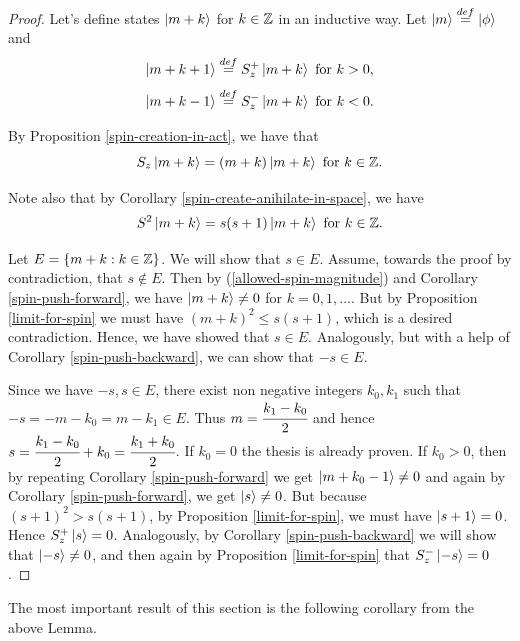 \documentclass[main.tex]{subfiles}
\begin{document}
\begin{proof}
Let's define states $\ket{m + k}$ for $k\in \mathbb{Z}$ in an inductive way. Let $\ket{m} \stackrel{def}{=} \ket{\phi}$ and
\begin{equation}
\ket{m + k + 1} \stackrel{def}{=} S^{+}_z \ket{m + k} \text{ for } k > 0,
\end{equation}
\begin{equation}
\ket{m + k - 1} \stackrel{def}{=} S^{-}_z \ket{m + k} \text{ for } k < 0.
\end{equation}

By Proposition \ref{spin-creation-in-act}, we have that
\begin{equation}
S_z \ket{m + k} = (m + k) \ket{m + k} \text{ for } k\in\mathbb{Z}.
\end{equation}

Note also that by Corollary \ref{spin-create-anihilate-in-space}, we have
\begin{equation}
\label{allowed-spin-magnitude}
S^2 \ket{m + k} = s(s + 1) \ket{m + k} \text{ for } k\in\mathbb{Z}. 
\end{equation}

Let $E = \{m + k: k\in \mathbb{Z}\}$. We will show that $s\in E$. Assume, towards the proof by contradiction, that $s\not\in E$. Then by (\ref{allowed-spin-magnitude}) and Corollary \ref{spin-push-forward}, we have 
$\ket{m + k} \not = 0$ for $k=0, 1, \dots$. But by Proposition \ref{limit-for-spin} we must have $(m + k)^2 \leq s(s+1)$, which is a desired contradiction. Hence, we have showed that $s\in E$. Analogously, but with a help of Corollary \ref{spin-push-backward}, we can show that $-s\in E$.

Since we have $-s, s\in E$, there exist non negative integers $k_0, k_1$ such that $-s = -m - k_0 = m - k_1 \in E$. Thus $m = \cfrac{k_1 - k_0}{2}$ and hence $s = \cfrac{k_1 - k_0}{2} + k_0 = \cfrac{k_1 + k_0}{2}$. If $k_0 = 0$ the thesis is already proven. If $k_0 > 0$, then by repeating Corollary \ref{spin-push-forward} we get $\ket{m + k_0 - 1}\not = 0$ and  again by Corollary \ref{spin-push-forward}, we get $\ket{s}\not = 0$. But because $(s + 1)^2 > s(s + 1)$, by Proposition \ref{limit-for-spin}, we must have $\ket{s + 1} = 0$. Hence $S^{+}_z \ket{s} = 0$. Analogously, by Corollary \ref{spin-push-backward} we will show that $\ket{-s}\not = 0$, and then again by Proposition \ref{limit-for-spin} that $S^{-}_z \ket{-s} = 0$.
\end{proof}

The most important result of this section is the following corollary from the above Lemma.
\end{document}
